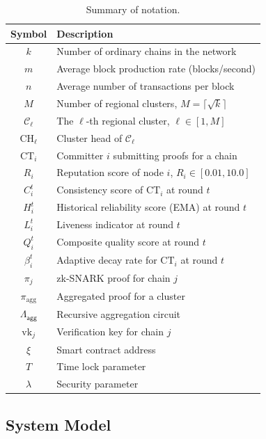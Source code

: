 \documentclass[journal]{IEEEtran}
\newcommand{\aggCircuit}{\Lambda_{\mathsf{agg}}}
\begin{document}
\begin{table}[H]
\centering
\caption{Summary of notation.}
\label{tab:notation}
\begin{tabular}{cl}
\toprule
Symbol & Description \\
\midrule
$k$ & Number of ordinary chains in the network \\
$m$ & Average block production rate (blocks/second) \\
$n$ & Average number of transactions per block \\
$M$ & Number of regional clusters, $M = \lceil \sqrt{k} \rceil$ \\
$\mathcal{C}_\ell$ & The $\ell$-th regional cluster, $\ell \in [1, M]$ \\
$\text{CH}_\ell$ & Cluster head of $\mathcal{C}_\ell$ \\
$\text{CT}_i$ & Committer $i$ submitting proofs for a chain \\
$R_i$ & Reputation score of node $i$, $R_i \in [0.01, 10.0]$ \\
$C_i^t$ & Consistency score of $\text{CT}_i$ at round $t$ \\
$H_i^t$ & Historical reliability score (EMA) at round $t$ \\
$L_i^t$ & Liveness indicator at round $t$ \\
$Q_i^t$ & Composite quality score at round $t$ \\
$\beta_i^t$ & Adaptive decay rate for $\text{CT}_i$ at round $t$ \\
$\pi_j$ & zk-SNARK proof for chain $j$ \\
$\pi_{\text{agg}}$ & Aggregated proof for a cluster \\
$\aggCircuit$ & Recursive aggregation circuit \\
$\text{vk}_j$ & Verification key for chain $j$ \\
$\xi$ & Smart contract address \\
$T$ & Time lock parameter \\
$\lambda$ & Security parameter \\
\bottomrule
\end{tabular}
\end{table}

\subsection{System Model}
\end{document}
